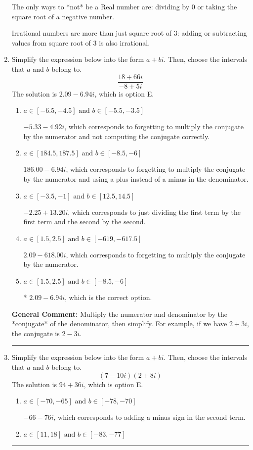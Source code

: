 \documentclass{extbook}[14pt]
\newcommand{\litem}[1]{\item #1

\rule{\textwidth}{0.4pt}}
\begin{document}
\begin{enumerate}
{ The only ways to *not* be a Real number are: dividing by 0 or taking the square root of a negative number. 
 
 Irrational numbers are more than just square root of 3: adding or subtracting values from square root of 3 is also irrational.
}
\litem{
Simplify the expression below into the form $a+bi$. Then, choose the intervals that $a$ and $b$ belong to.
\[ \frac{18 + 66 i}{-8 + 5 i} \]
The solution is \( 2.09  - 6.94 i \), which is option E.\begin{enumerate}[label=\Alph*.]
\item \( a \in [-6.5, -4.5] \text{ and } b \in [-5.5, -3.5] \)

 $-5.33  - 4.92 i$, which corresponds to forgetting to multiply the conjugate by the numerator and not computing the conjugate correctly.
\item \( a \in [184.5, 187.5] \text{ and } b \in [-8.5, -6] \)

 $186.00  - 6.94 i$, which corresponds to forgetting to multiply the conjugate by the numerator and using a plus instead of a minus in the denominator.
\item \( a \in [-3.5, -1] \text{ and } b \in [12.5, 14.5] \)

 $-2.25  + 13.20 i$, which corresponds to just dividing the first term by the first term and the second by the second.
\item \( a \in [1.5, 2.5] \text{ and } b \in [-619, -617.5] \)

 $2.09  - 618.00 i$, which corresponds to forgetting to multiply the conjugate by the numerator.
\item \( a \in [1.5, 2.5] \text{ and } b \in [-8.5, -6] \)

* $2.09  - 6.94 i$, which is the correct option.
\end{enumerate}

\textbf{General Comment:} Multiply the numerator and denominator by the *conjugate* of the denominator, then simplify. For example, if we have $2+3i$, the conjugate is $2-3i$.
}
\litem{
Simplify the expression below into the form $a+bi$. Then, choose the intervals that $a$ and $b$ belong to.
\[ (7 - 10 i)(2 + 8 i) \]
The solution is \( 94 + 36 i \), which is option E.\begin{enumerate}[label=\Alph*.]
\item \( a \in [-70, -65] \text{ and } b \in [-78, -70] \)

 $-66 - 76 i$, which corresponds to adding a minus sign in the second term.
\item \( a \in [11, 18] \text{ and } b \in [-83, -77] \)


\end{enumerate}}
\end{enumerate}
\end{document}
